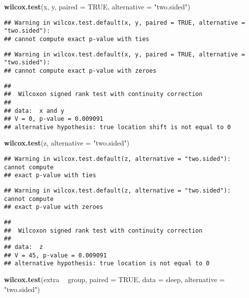 \documentclass[
]{book}
\newenvironment{Shaded}{\begin{snugshade}}{\end{snugshade}}
\newcommand{\DataTypeTok}[1]{\textcolor[rgb]{0.13,0.29,0.53}{#1}}
\newcommand{\KeywordTok}[1]{\textcolor[rgb]{0.13,0.29,0.53}{\textbf{#1}}}
\newcommand{\NormalTok}[1]{#1}
\newcommand{\OperatorTok}[1]{\textcolor[rgb]{0.81,0.36,0.00}{\textbf{#1}}}
\newcommand{\OtherTok}[1]{\textcolor[rgb]{0.56,0.35,0.01}{#1}}
\newcommand{\StringTok}[1]{\textcolor[rgb]{0.31,0.60,0.02}{#1}}
\begin{document}
\begin{Shaded}
\begin{Highlighting}[]
\KeywordTok{wilcox.test}\NormalTok{(x, y, }\DataTypeTok{paired =} \OtherTok{TRUE}\NormalTok{, }\DataTypeTok{alternative =} \StringTok{"two.sided"}\NormalTok{)}
\end{Highlighting}
\end{Shaded}

\begin{verbatim}
## Warning in wilcox.test.default(x, y, paired = TRUE, alternative = "two.sided"):
## cannot compute exact p-value with ties
\end{verbatim}

\begin{verbatim}
## Warning in wilcox.test.default(x, y, paired = TRUE, alternative = "two.sided"):
## cannot compute exact p-value with zeroes
\end{verbatim}

\begin{verbatim}
## 
##  Wilcoxon signed rank test with continuity correction
## 
## data:  x and y
## V = 0, p-value = 0.009091
## alternative hypothesis: true location shift is not equal to 0
\end{verbatim}

\begin{Shaded}
\begin{Highlighting}[]
\KeywordTok{wilcox.test}\NormalTok{(z, }\DataTypeTok{alternative =} \StringTok{"two.sided"}\NormalTok{)}
\end{Highlighting}
\end{Shaded}

\begin{verbatim}
## Warning in wilcox.test.default(z, alternative = "two.sided"): cannot compute
## exact p-value with ties
\end{verbatim}

\begin{verbatim}
## Warning in wilcox.test.default(z, alternative = "two.sided"): cannot compute
## exact p-value with zeroes
\end{verbatim}

\begin{verbatim}
## 
##  Wilcoxon signed rank test with continuity correction
## 
## data:  z
## V = 45, p-value = 0.009091
## alternative hypothesis: true location is not equal to 0
\end{verbatim}

\begin{Shaded}
\begin{Highlighting}[]
\KeywordTok{wilcox.test}\NormalTok{(extra }\OperatorTok{~}\StringTok{ }\NormalTok{group, }\DataTypeTok{paired =} \OtherTok{TRUE}\NormalTok{, }\DataTypeTok{data =}\NormalTok{ sleep, }\DataTypeTok{alternative =} \StringTok{"two.sided"}\NormalTok{)}
\end{Highlighting}
\end{Shaded}
\end{document}
